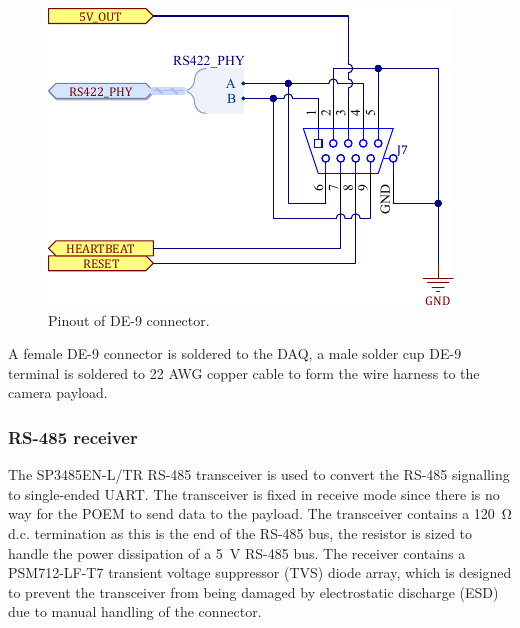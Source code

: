 \documentclass[]{report}
\begin{document}
\begin{figure}[H]
  \centering
  \includegraphics[width=\linewidth]{images/de-9-connector.pdf}
  \caption{Pinout of DE-9 connector.}
  \label{fig:de-9-connector}
\end{figure}

A female DE-9 connector is soldered to the DAQ, a male solder cup DE-9 terminal is soldered to 22 AWG copper cable to form the wire harness to the camera payload.

\subsubsection{RS-485 receiver}
The SP3485EN-L/TR RS-485 transceiver is used to convert the RS-485 signalling to single-ended UART. The transceiver is fixed in receive mode since there is no way for the POEM to send data to the payload. The transceiver contains a \SI{120}{\ohm} d.c. termination as this is the end of the RS-485 bus, the resistor is sized to handle the power dissipation of a \SI{5}{\volt} RS-485 bus. The receiver contains a PSM712-LF-T7 transient voltage suppressor (TVS) diode array, which is designed to prevent the transceiver from being damaged by electrostatic discharge (ESD) due to manual handling of the connector.
\end{document}
